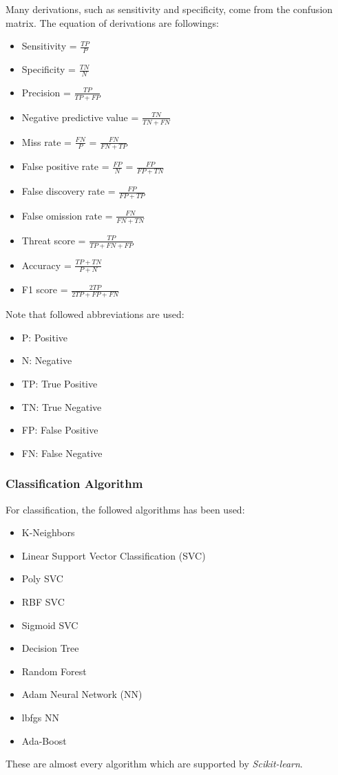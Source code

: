 \documentclass[11pt, a4paper]{article}
\begin{document}
					Many derivations, such as sensitivity and specificity, come from the confusion matrix. The equation of derivations are followings:
					\begin{itemize}
						\item Sensitivity = $\frac{TP}{P}$
						\item Specificity = $\frac{TN}{N}$
						\item Precision = $\frac{TP}{TP + FP}$
						\item Negative predictive value = $\frac{TN}{TN + FN}$
						\item Miss rate = $\frac{FN}{P}$ = $\frac{FN}{FN + TP}$
						\item False positive rate = $\frac{FP}{N}$ = $\frac{FP}{FP + TN}$
						\item False discovery rate = $\frac{FP}{FP + TP}$
						\item False omission rate = $\frac{FN}{FN + TN}$
						\item Threat score = $\frac{TP}{TP + FN + FP}$
						\item Accuracy = $\frac{TP+TN}{P + N}$
						\item F1 score = $\frac{2TP}{2TP + FP + FN}$
					\end{itemize}
					
					Note that followed abbreviations are used:
					\begin{itemize}
						\item P: Positive
						\item N: Negative
						\item TP: True Positive
						\item TN: True Negative
						\item FP: False Positive
						\item FN: False Negative
					\end{itemize}
				
			\subsubsection{Classification Algorithm}
				For classification, the followed algorithms has been used:
				\begin{itemize}
					\item K-Neighbors
					\item Linear Support Vector Classification (SVC)
					\item Poly SVC
					\item RBF SVC
					\item Sigmoid SVC
					\item Decision Tree
					\item Random Forest
					\item Adam Neural Network (NN)
					\item lbfgs NN
					\item Ada-Boost
				\end{itemize}
				These are almost every algorithm which are supported by \textit{Scikit-learn}.
				
\end{document}
